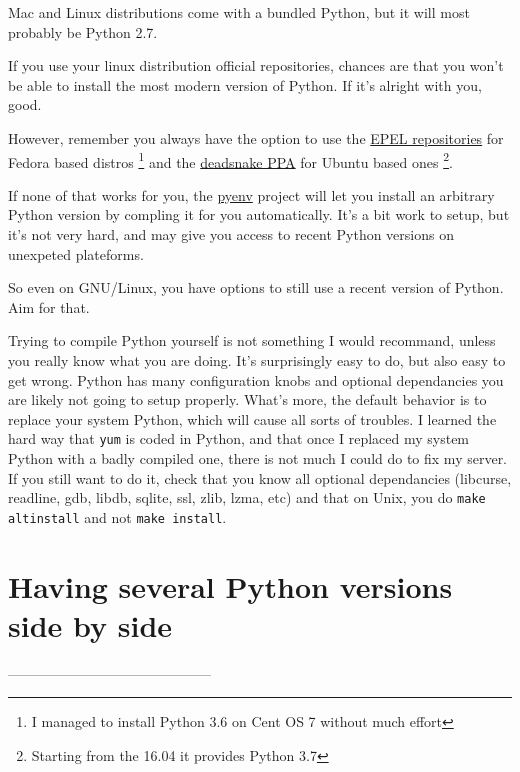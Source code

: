 \begin{warning}
    Mac and Linux distributions come with a bundled Python, but it will most probably be Python 2.7.
\end{warning}

If you use your linux distribution official repositories, chances are that you won't be able to install the most modern version of Python. If it's alright with you, good.

However, remember you always have the option to use the \href{https://fedoraproject.org/wiki/EPEL}{EPEL repositories} for Fedora based distros \footnote{I managed to install Python 3.6 on Cent OS 7 without much effort} and the \href{https://launchpad.net/~deadsnakes/+archive/ubuntu/ppa}{deadsnake PPA} for Ubuntu based ones \footnote{Starting from the 16.04 it provides Python 3.7}.

If none of that works for you, the \href{https://github.com/pyenv/pyenv}{pyenv} project will let you install an arbitrary Python version by compling it for you automatically. It's a bit work to setup, but it's not very hard, and may give you access to recent Python versions on unexpeted plateforms.

So even on GNU/Linux, you have options to still use a recent version of Python. Aim for that.

\begin{warning}
    Trying to compile Python yourself is not something I would recommand, unless you really know what you are doing. It's surprisingly easy to do, but also easy to get wrong. Python has many configuration knobs and optional dependancies you are likely not going to setup properly. What's more, the default behavior is to replace your system Python, which will cause all sorts of troubles. I learned the hard way that \lstinline{yum} is coded in Python, and that once I replaced my system Python with a badly compiled one, there is not much I could do to fix my server. If you still want to do it, check that you know all optional dependancies (libcurse, readline, gdb, libdb, sqlite, ssl, zlib, lzma, etc) and that on Unix, you do \lstinline{make altinstall} and not \lstinline{make install}.
\end{warning}

\section{Having several Python versions side by side}
--------------------------------------------

